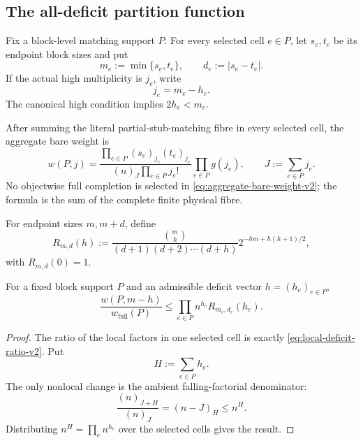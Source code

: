 
\subsection{The all-deficit partition function}
\label{subsec:all-deficit-partition-function}

Fix a block-level matching support $P$.  For every selected cell $e\in P$, let
$s_e,t_e$ be its endpoint block sizes and put
\[
  m_e:=\min\{s_e,t_e\},
  \qquad
  d_e:=|s_e-t_e|.
\]
If the actual high multiplicity is $j_e$, write
\[
  j_e=m_e-h_e.
\]
The canonical high condition implies $2h_e<m_e$.

After summing the literal partial-stub-matching fibre in every selected cell,
the aggregate bare weight is
\begin{equation}
  w(P,j)
  =
  \frac{\displaystyle\prod_{e\in P}
    (s_e)_{j_e}(t_e)_{j_e}}
  {\displaystyle (n)_J\prod_{e\in P}j_e!}
  \prod_{e\in P}g(j_e),
  \qquad
  J:=\sum_{e\in P}j_e.
  \label{eq:aggregate-bare-weight-v2}
\end{equation}
No objectwise full completion is selected in
\eqref{eq:aggregate-bare-weight-v2}; the formula is the sum of the complete
finite physical fibre.

For endpoint sizes $m,m+d$, define
\begin{equation}
  R_{m,d}(h)
  :=
  \frac{\binom mh}{(d+1)(d+2)\cdots(d+h)}
  2^{-hm+h(h+1)/2},
  \label{eq:local-deficit-ratio-v2}
\end{equation}
with $R_{m,d}(0)=1$.

\begin{lemma}
\label{lem:aggregate-deficit-comparison-v2}
For a fixed block support $P$ and an admissible deficit vector
$h=(h_e)_{e\in P}$,
\[
  \frac{w(P,m-h)}{w_{\mathrm{full}}(P)}
  \le
  \prod_{e\in P}n^{h_e}R_{m_e,d_e}(h_e).
\]
\end{lemma}

\begin{proof}
The ratio of the local factors in one selected cell is exactly
\eqref{eq:local-deficit-ratio-v2}.  Put
\[
  H:=\sum_{e\in P}h_e.
\]
The only nonlocal change is the ambient falling-factorial denominator:
\[
  \frac{(n)_{J+H}}{(n)_J}
  =(n-J)_H
  \le n^H.
\]
Distributing $n^H=\prod_e n^{h_e}$ over the selected cells gives the result.
\end{proof}


